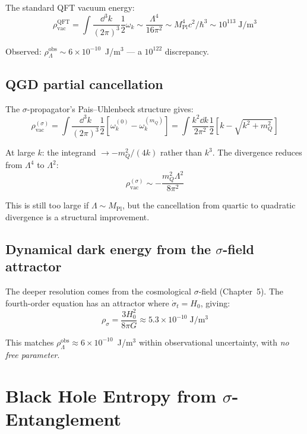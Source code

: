 \documentclass[11pt,a4paper]{article}
\theoremstyle{plain}
\theoremstyle{definition}
\theoremstyle{remark}
\newcommand{\mQ}{m_Q}
\newcommand{\Mpl}{M_{\mathrm{Pl}}}
\begin{document}
The standard QFT vacuum energy:
\begin{equation}
  \rho_{\mathrm{vac}}^{\mathrm{QFT}} = \int\frac{\dd^3k}{(2\pi)^3}\frac{1}{2}\omega_k \sim \frac{\Lambda^4}{16\pi^2} \sim \Mpl^4 c^2/\hbar^3 \sim 10^{113}\;\mathrm{J/m^3}
\end{equation}

Observed: $\rho_\Lambda^{\mathrm{obs}} \sim 6\times10^{-10}$~J/m$^3$ --- a $10^{122}$ discrepancy.

\subsection{QGD partial cancellation}

The $\sigma$-propagator's Pais--Uhlenbeck structure gives:
\begin{equation}
  \rho_{\mathrm{vac}}^{(\sigma)} = \int\frac{\dd^3k}{(2\pi)^3}\frac{1}{2}\left[\omega_k^{(0)} - \omega_k^{(\mQ)}\right] = \int\frac{k^2\dd k}{2\pi^2}\frac{1}{2}\left[k - \sqrt{k^2+\mQ^2}\right]
\end{equation}

At large $k$: the integrand $\to -\mQ^2/(4k)$ rather than $k^3$.  The divergence reduces from $\Lambda^4$ to $\Lambda^2$:
\begin{equation}
  \rho_{\mathrm{vac}}^{(\sigma)} \sim -\frac{\mQ^2\Lambda^2}{8\pi^2}
\end{equation}

This is still too large if $\Lambda \sim \Mpl$, but the cancellation from quartic to quadratic divergence is a structural improvement.

\subsection{Dynamical dark energy from the $\sigma$-field attractor}

The deeper resolution comes from the cosmological $\sigma$-field (Chapter~5).  The fourth-order equation has an attractor where $\dot\sigma_t = H_0$, giving:
\begin{equation}
  \rho_\sigma = \frac{3H_0^2}{8\pi G} \approx 5.3\times10^{-10}\;\mathrm{J/m^3}
\end{equation}

This matches $\rho_\Lambda^{\mathrm{obs}} \approx 6\times10^{-10}$~J/m$^3$ within observational uncertainty, with \emph{no free parameter}.

\section{Black Hole Entropy from $\sigma$-Entanglement}
\label{sec:entropy}
\end{document}
